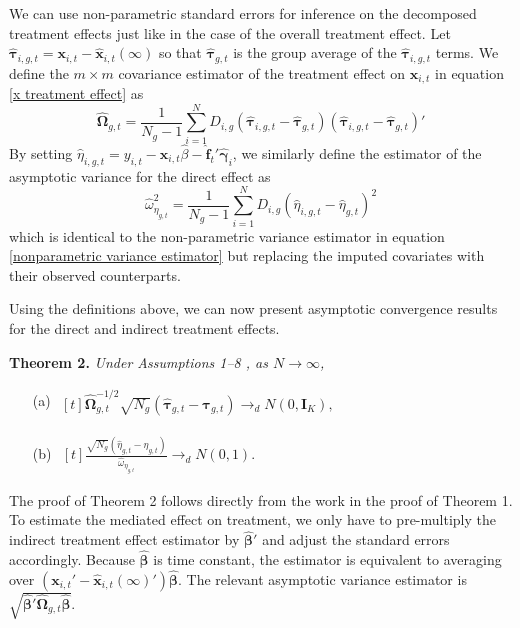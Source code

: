 \documentclass[12pt,fleqn]{article}
\def\*#1{\mathbf{#1}}
\def\+#1{\boldsymbol{#1}}
\begin{document}
We can use non-parametric standard errors for inference on the decomposed treatment effects just like in the case of the overall treatment effect. Let $\widehat{\+\tau}_{i,g,t} = \*x_{i,t} - \widehat{\*x}_{i,t}(\infty)$ so that $\widehat{\+\tau}_{g,t}$ is the group average of the $\widehat{\+\tau}_{i,g,t}$ terms. We define the $m \times m$ covariance estimator of the treatment effect on $\*x_{i,t}$ in equation \eqref{x treatment effect} as 
\begin{equation}
    \widehat{\+\Omega}_{g, t} = \frac{1}{N_g - 1} \sum_{i = 1}^N D_{i,g} \left( \widehat{\+\tau}_{i,g,t} - \widehat{\+\tau}_{g,t} \right) \left( \widehat{\+\tau}_{i,g,t} - \widehat{\+\tau}_{g,t} \right)' 
\end{equation}
By setting $\widehat{\eta}_{i,g,t} = y_{i,t} - \*x_{i,t} \widehat{\beta} - \widehat{\*f}_t' \widehat{\+\gamma}_i$, we similarly define the estimator of the asymptotic variance for the direct effect as 
\begin{equation}
    \widehat{\omega}^2_{\eta_{g,t}} = \frac{1}{N_g - 1} \sum_{i = 1}^N D_{i,g} \left( \widehat{\eta}_{i,g,t} - \widehat{\eta}_{g,t} \right)^2
\end{equation}
which is identical to the non-parametric variance estimator in equation \eqref{nonparametric variance estimator} but replacing the imputed covariates with their observed counterparts. 

Using the definitions above, we can now present asymptotic convergence results for the direct and indirect treatment effects.

\noindent \textbf{Theorem 2.} \emph{Under Assumptions 1--8 , as $N\to\infty$,}
\begin{itemize}
  \item[(a)] $\begin{aligned}[t]
    \widehat{\+\Omega}_{g, t}^{-1/2} \sqrt{N_g} \left( \widehat{\+\tau}_{g,t} - \+\tau_{g,t} \right) \to_d N(0, \*I_K ),
    \end{aligned}$

  \item[(b)] $\begin{aligned}[t]
    \frac{\sqrt{N_g} \left(  \widehat \eta_{g,t} - \eta_{g,t} \right)}{\widehat{\omega}_{\eta_{g,t}}}  \to_d N(0,1).
    \end{aligned}$
\end{itemize}

\bigskip

The proof of Theorem 2 follows directly from the work in the proof of Theorem 1. To estimate the mediated effect on treatment, we only have to pre-multiply the indirect treatment effect estimator by $\widehat{\+\beta}'$ and adjust the standard errors accordingly. Because $\widehat{\+\beta}$ is time constant, the estimator is equivalent to averaging over $\left( \*x_{i,t}' - \widehat{\*x}_{i,t}(\infty)' \right) \widehat{\+\beta}$. The relevant asymptotic variance estimator is $\sqrt{\widehat{\+\beta}' \widehat{\+\Omega}_{g,t} \widehat{\+\beta}}$.
\end{document}

